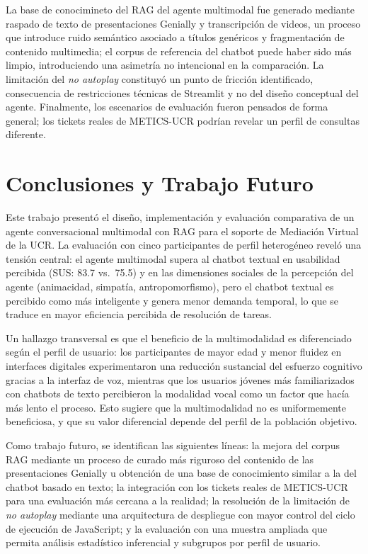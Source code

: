 \documentclass[conference]{IEEEtran}
\begin{document}
La base de conocimineto del RAG del agente multimodal fue generado mediante raspado de texto de presentaciones Genially y transcripción de videos, un proceso que introduce ruido semántico asociado a títulos genéricos y fragmentación de contenido multimedia; el corpus de referencia del chatbot puede haber sido más limpio, introduciendo una asimetría no intencional en la comparación. La limitación del \textit{no autoplay} constituyó un punto de fricción identificado, consecuencia de restricciones técnicas de Streamlit y no del diseño conceptual del agente. Finalmente, los escenarios de evaluación fueron pensados de forma general; los tickets reales de METICS-UCR podrían revelar un perfil de consultas diferente.

\section{Conclusiones y Trabajo Futuro}

Este trabajo presentó el diseño, implementación y evaluación comparativa de un agente conversacional multimodal con RAG para el soporte de Mediación Virtual de la UCR. La evaluación con cinco participantes de perfil heterogéneo reveló una tensión central: el agente multimodal supera al chatbot textual en usabilidad percibida (SUS: 83.7 vs.~75.5) y en las dimensiones sociales de la percepción del agente (animacidad, simpatía, antropomorfismo), pero el chatbot textual es percibido como más inteligente y genera menor demanda temporal, lo que se traduce en mayor eficiencia percibida de resolución de tareas.

Un hallazgo transversal es que el beneficio de la multimodalidad es diferenciado según el perfil de usuario: los participantes de mayor edad y menor fluidez en interfaces digitales experimentaron una reducción sustancial del esfuerzo cognitivo gracias a la interfaz de voz, mientras que los usuarios jóvenes más familiarizados con chatbots de texto percibieron la modalidad vocal como un factor que hacía más lento el proceso. Esto sugiere que la multimodalidad no es uniformemente beneficiosa, y que su valor diferencial depende del perfil de la población objetivo.

Como trabajo futuro, se identifican las siguientes líneas: la mejora del corpus RAG mediante un proceso de curado más riguroso del contenido de las presentaciones Genially u obtención de una base de conocimiento similar a la del chatbot basado en texto; la integración con los tickets reales de METICS-UCR para una evaluación más cercana a la realidad; la resolución de la limitación de \textit{no autoplay} mediante una arquitectura de despliegue con mayor control del ciclo de ejecución de JavaScript; y la evaluación con una muestra ampliada que permita análisis estadístico inferencial y subgrupos por perfil de usuario.
\end{document}
